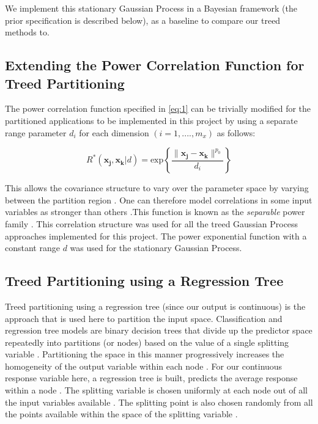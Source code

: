 \documentclass{article}\usepackage[]{graphicx}\usepackage[]{color}
\begin{document}
We implement this stationary Gaussian Process in a Bayesian framework (the prior specification is described below), as a baseline to compare our treed methods to.

\subsection*{Extending the Power Correlation Function for Treed Partitioning}

The power correlation function specified in \ref{eq:1} can be trivially modified for the partitioned applications to be implemented in this project by using a separate range parameter $d_i$ for each dimension $(i = 1,...., m_x)$ as follows:

\begin{equation}
\label{eq:13}
R^{*}(\boldsymbol{x_j},\boldsymbol{x_k}|d) = \text{exp} \left\{ \frac{\lVert \boldsymbol{x_j} - \boldsymbol{x_k}\rVert^{p_0}}{d_i} \right\}
\end{equation}

This allows the covariance structure to vary over the parameter space by varying between the partition region \cite{gramacy_lee_2008}. One can therefore model correlations in some input variables as stronger than others \cite{gramacy_lee_2008}.This function is known as the \textit{separable} power family \cite{gramacy_2007}. This correlation structure was used for all the treed Gaussian Process approaches implemented for this project. The power exponential function with a constant range $d$ was used for the stationary Gaussian Process.

\subsection*{Treed Partitioning using a Regression Tree}

Treed partitioning using a regression tree (since our output is continuous) is the approach that is used here to partition the input space. Classification and regression tree models are binary decision trees that  divide up the predictor space repeatedly into partitions (or nodes) based on the value of a single splitting variable \cite{hu_2011}. Partitioning the space in this manner progressively increases the homogeneity of the output variable within each node \cite{hu_2011}. For our continuous response variable here, a regression tree is built, predicts the average response within a node \cite{hu_2011}. The splitting variable is chosen uniformly at each node out of all the input variables available \cite{chipman_1998}. The splitting point is also chosen randomly from all the points available within the space of the splitting variable \cite{chipman_1998}. 
\end{document}
